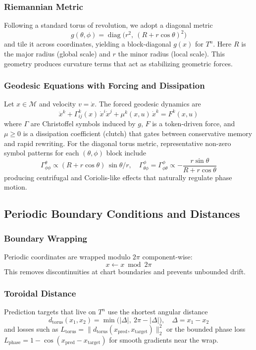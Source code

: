 \documentclass{article}
\numberwithin{equation}{section}
\begin{document}
\subsubsection{Riemannian Metric}
Following a standard torus of revolution, we adopt a diagonal metric
\[
g(\theta,\phi) = \operatorname{diag}\big(r^2,\ (R + r\cos\theta)^2\big)
\]
and tile it across coordinates, yielding a block-diagonal $g(x)$ for $T^n$. Here $R$ is the major radius (global scale) and $r$ the minor radius (local scale). This geometry produces curvature terms that act as stabilizing geometric forces.

\subsubsection{Geodesic Equations with Forcing and Dissipation}
Let $x \in \mathcal{M}$ and velocity $v = \dot{x}$. The forced geodesic dynamics are
\[
\ddot{x}^k + \Gamma^k_{ij}(x)\,\dot{x}^i\dot{x}^j + \mu^k(x,u)\,\dot{x}^k = F^k(x,u)
\]
where $\Gamma$ are Christoffel symbols induced by $g$, $F$ is a token-driven force, and $\mu\ge 0$ is a dissipation coefficient (clutch) that gates between conservative memory and rapid rewriting. For the diagonal torus metric, representative non-zero symbol patterns for each $(\theta,\phi)$ block include
\[
\Gamma^{\theta}_{\phi\phi} \propto (R + r\cos\theta)\,\sin\theta / r,\quad
\Gamma^{\phi}_{\theta\phi} = \Gamma^{\phi}_{\phi\theta} \propto -\frac{r\sin\theta}{R + r\cos\theta}
\]
producing centrifugal and Coriolis-like effects that naturally regulate phase motion.

\subsection{Periodic Boundary Conditions and Distances}
\subsubsection{Boundary Wrapping}
Periodic coordinates are wrapped modulo $2\pi$ component-wise:
\[
x \leftarrow x \bmod 2\pi
\]
This removes discontinuities at chart boundaries and prevents unbounded drift.

\subsubsection{Toroidal Distance}
Prediction targets that live on $T^n$ use the shortest angular distance
\[
d_{\text{torus}}(x_1,x_2) = \min\!\big(|\Delta|,\ 2\pi - |\Delta|\big),\quad \Delta = x_1-x_2
\]
and losses such as $L_{\text{torus}} = \|d_{\text{torus}}(x_{\text{pred}},x_{\text{target}})\|_2^2$ or the bounded phase loss $L_{\text{phase}} = 1 - \cos(x_{\text{pred}} - x_{\text{target}})$ for smooth gradients near the wrap.
\end{document}
